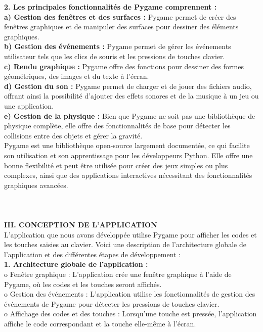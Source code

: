 \documentclass[a4paper, 12px]{article}
\begin{document}
{\bfseries 2. Les principales fonctionnalités de Pygame comprennent :\\

a)	Gestion des fenêtres et des surfaces :} Pygame permet de créer des fenêtres graphiques et de manipuler des surfaces pour dessiner des éléments graphiques.\\
{\bfseries b)	Gestion des événements :} Pygame permet de gérer les événements utilisateur tels que les clics de souris et les pressions de touches clavier.\\
{\bfseries c)	Rendu graphique :} Pygame offre des fonctions pour dessiner des formes géométriques, des images et du texte à l'écran.\\
{\bfseries d)	Gestion du son :} Pygame permet de charger et de jouer des fichiers audio, offrant ainsi la possibilité d'ajouter des effets sonores et de la musique à un jeu ou une application.\\
{\bfseries e)	Gestion de la physique :} Bien que Pygame ne soit pas une bibliothèque de physique complète, elle offre des fonctionnalités de base pour détecter les collisions entre des objets et gérer la gravité.\\

Pygame est une bibliothèque open-source largement documentée, ce qui facilite son utilisation et son apprentissage pour les développeurs Python. Elle offre une bonne flexibilité et peut être utilisée pour créer des jeux simples ou plus complexes, ainsi que des applications interactives nécessitant des fonctionnalités graphiques avancées.
\\
\\
\\
\\
{\bfseries \MakeUppercase{III. Conception de l'application}}\\

L'application que nous avons développée utilise Pygame pour afficher les codes et les touches saisies au clavier. Voici une description de l'architecture globale de l'application et des différentes étapes de développement :\\

{\bfseries 1.	Architecture globale de l'application :}\\

o	Fenêtre graphique : L'application crée une fenêtre graphique à l'aide de Pygame, où les codes et les touches seront affichés.\\
o	Gestion des événements : L'application utilise les fonctionnalités de gestion des événements de Pygame pour détecter les pressions de touches clavier.\\
o	Affichage des codes et des touches : Lorsqu'une touche est pressée, l'application affiche le code correspondant et la touche elle-même à l'écran.\\
\end{document}
